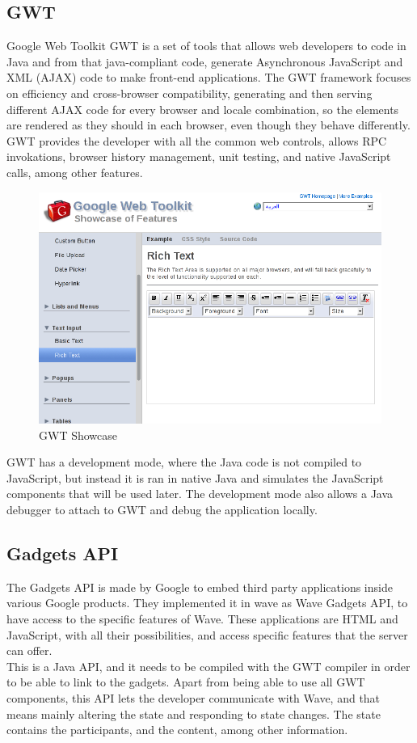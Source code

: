 \subsection{GWT}
Google Web Toolkit GWT is a set of tools that allows web developers to code in Java and from that java-compliant code, generate Asynchronous JavaScript and XML (AJAX) code to make front-end applications. The GWT framework focuses on efficiency and cross-browser compatibility, generating and then serving different AJAX code for every browser and locale combination, so the elements are rendered as they should in each browser, even though they behave differently. GWT provides the developer with all the common web controls, allows RPC invokations, browser history management, unit testing, and native JavaScript calls, among other features.
\begin{figure}[H]
  \center
    \includegraphics[keepaspectratio, scale=0.4]{Media/Captures/GWT/gwt_showcase.png}
  \caption{GWT Showcase}
  \label{fig:gwt_showcase}
\end{figure}
GWT has a development mode, where the Java code is not compiled to JavaScript, but instead it is ran in native Java and simulates the JavaScript components that will be used later. The development mode also allows a Java debugger to attach to GWT and debug the application locally. 

\subsection{Gadgets API}
The Gadgets API is made by Google to embed third party applications inside various Google products. They implemented it in wave as Wave Gadgets API, to have access to the specific features of Wave. These applications are HTML and JavaScript, with all their possibilities, and access specific features that the server can offer.\\[.3cm]
This is a Java API, and it needs to be compiled with the GWT compiler in order to be able to link to the gadgets. Apart from being able to use all GWT components, this API lets the developer communicate with Wave, and that means mainly altering the state and responding to state changes. The state contains the participants, and the content, among other information. 

